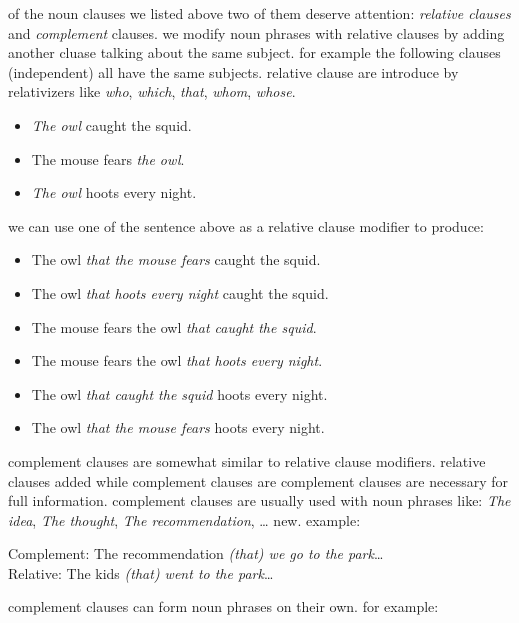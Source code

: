 \documentclass[a4paper]{article}
\begin{document}
of the noun clauses we listed above two of them deserve attention: \emph{relative clauses} and \emph{complement} clauses. we modify noun
phrases with relative clauses by adding another cluase talking about the same subject. for example the following clauses (independent) 
all have the same subjects. relative clause are introduce by relativizers like \emph{who}, \emph{which}, \emph{that}, \emph{whom}, 
\emph{whose}.

\begin{flushleft}

    \begin{itemize}
        \item \emph{The owl} caught the squid.
        \item The mouse fears \emph{the owl}.
        \item \emph{The owl} hoots every night.
    \end{itemize}
    we can use one of the sentence above as a relative clause modifier to produce:
    \begin{itemize}
        \item The owl \emph{that the mouse fears} caught the squid.
        \item The owl \emph{that hoots every night} caught the squid.
        \item The mouse fears the owl \emph{that caught the squid}.
        \item The mouse fears the owl \emph{that hoots every night}.
        \item The owl \emph{that caught the squid} hoots every night.
        \item The owl \emph{that the mouse fears} hoots every night.
    \end{itemize}
\end{flushleft}

complement clauses are somewhat similar to relative clause modifiers. relative clauses added while complement clauses are
complement clauses are necessary for full information. complement clauses are usually used with noun phrases like:
\emph{The idea}, \emph{The thought}, \emph{The recommendation}, \ldots 
new. example: 
\begin{flushleft}
    Complement: The recommendation \emph{(that) we go to the park}\ldots \\
    Relative: The kids \emph{(that) went to the park}\ldots
\end{flushleft}

complement clauses can form noun phrases on their own. for example:
\end{document}

